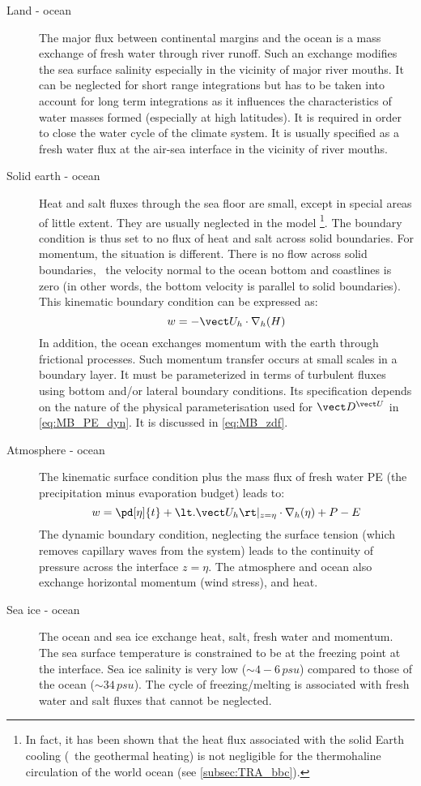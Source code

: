 \documentclass[../main/NEMO_manual]{subfiles}
\begin{document}
\begin{description}
\item [Land - ocean] The major flux between continental margins and the ocean is a mass exchange of
  fresh water through river runoff.
  Such an exchange modifies the sea surface salinity especially in the vicinity of major river mouths.
  It can be neglected for short range integrations but
  has to be taken into account for long term integrations as
  it influences the characteristics of water masses formed (especially at high latitudes).
  It is required in order to close the water cycle of the climate system.
  It is usually specified as a fresh water flux at the air-sea interface in
  the vicinity of river mouths.
\item [Solid earth - ocean] Heat and salt fluxes through the sea floor are small,
  except in special areas of little extent.
  They are usually neglected in the model \footnote{
    In fact, it has been shown that the heat flux associated with the solid Earth cooling
    (\ie\ the geothermal heating) is not negligible for
    the thermohaline circulation of the world ocean (see \autoref{subsec:TRA_bbc}).
  }.
  The boundary condition is thus set to no flux of heat and salt across solid boundaries.
  For momentum, the situation is different.
  There is no flow across solid boundaries,
  \ie\ the velocity normal to the ocean bottom and coastlines is zero
  (in other words, the bottom velocity is parallel to solid boundaries).
  This kinematic boundary condition can be expressed as:
  \begin{equation}
    \label{eq:MB_w_bbc}
    w = - \vect U_h \cdot \nabla_h (H)
  \end{equation}
  In addition, the ocean exchanges momentum with the earth through frictional processes.
  Such momentum transfer occurs at small scales in a boundary layer.
  It must be parameterized in terms of turbulent fluxes using
  bottom and/or lateral boundary conditions.
  Its specification depends on the nature of the physical parameterisation used for
  $\vect D^{\vect U}$ in \autoref{eq:MB_PE_dyn}.
  It is discussed in \autoref{eq:MB_zdf}. %
\item [Atmosphere - ocean] The kinematic surface condition plus the mass flux of fresh water PE
  (the precipitation minus evaporation budget) leads to:
  \[
    w = \pd[\eta]{t} + \lt. \vect U_h \rt|_{z = \eta} \cdot \nabla_h (\eta) + P - E
  \]
  The dynamic boundary condition, neglecting the surface tension
  (which removes capillary waves from the system) leads to
  the continuity of pressure across the interface $z = \eta$.
  The atmosphere and ocean also exchange horizontal momentum (wind stress), and heat.
\item [Sea ice - ocean] The ocean and sea ice exchange heat, salt, fresh water and momentum.
  The sea surface temperature is constrained to be at the freezing point at the interface.
  Sea ice salinity is very low ($\sim4-6 \, psu$) compared to those of the ocean ($\sim34 \, psu$).
  The cycle of freezing/melting is associated with fresh water and salt fluxes that
  cannot be neglected.
\end{description}
\end{document}

